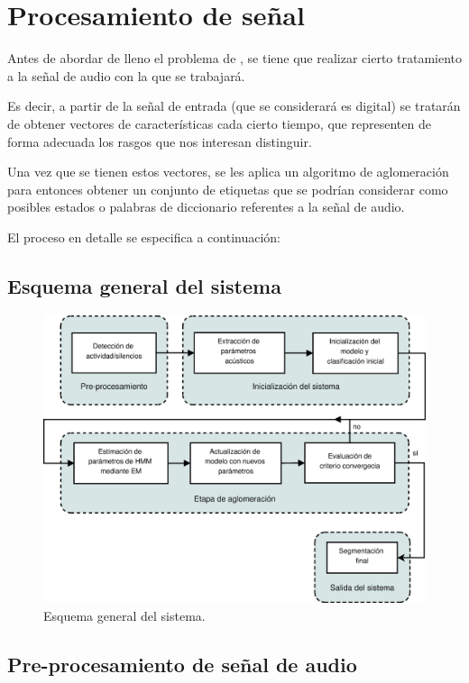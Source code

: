 \section{Procesamiento de señal}

Antes de abordar de lleno el problema de \sd, se tiene que realizar cierto tratamiento a la señal de audio con la que se trabajará. 

Es decir, a partir de la señal de entrada (que se considerará es digital) se tratarán de obtener vectores de características cada cierto tiempo, que representen de forma adecuada los rasgos que nos interesan distinguir.

Una vez que se tienen estos vectores, se les aplica un algoritmo de aglomeración para entonces obtener un conjunto de etiquetas que se podrían considerar como posibles estados o palabras de diccionario referentes a la señal de audio.

El proceso en detalle se especifica a continuación: 
\subsection{Esquema general del sistema}

\begin{figure}[ht]
  \centerline
  {\includegraphics[width=1.4\linewidth]{gfx/chap2/ASR_flow}} \quad
  \caption{Esquema general del sistema.}
  \label{fig:esquema}
\end{figure}

\subsection{Pre-procesamiento de señal de audio}

